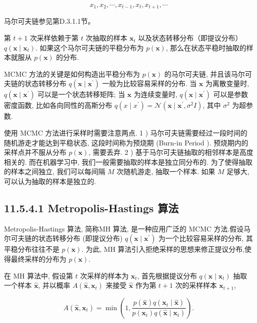 \documentclass[10pt]{article}
\begin{document}
$$
x_{1}, x_{2}, \cdots, x_{t-1}, x_{t}, x_{t+1}, \cdots
$$

马尔可夫链参见第D.3.1.1节。

第 $t+1$ 次采样依赖于第 $t$ 次抽取的样本 $\boldsymbol{x}_{t}$ 以及状态转移分布（即提议分布） $q\left(\boldsymbol{x} \mid \boldsymbol{x}_{t}\right)$. 如果这个马尔可夫链的平稳分布为 $p(\boldsymbol{x})$, 那么在状态平稳时抽取的样本就服从 $p(\boldsymbol{x})$ 的分布.

MCMC 方法的关键是如何构造出平稳分布为 $p(\boldsymbol{x})$ 的马尔可夫链, 并且该马尔可夫链的状态转移分布 $q\left(\boldsymbol{x} \mid \boldsymbol{x}^{\prime}\right)$ 一般为比较容易采样的分布. 当 $\boldsymbol{x}$ 为离散变量时, $q\left(\boldsymbol{x} \mid \boldsymbol{x}^{\prime}\right)$ 可以是一个状态转移矩阵; 当 $\boldsymbol{x}$ 为连续变量时, $q\left(\boldsymbol{x} \mid \boldsymbol{x}^{\prime}\right)$ 可以是参数密度函数, 比如各向同性的高斯分布 $q\left(x \mid x^{\prime}\right)=\mathcal{N}\left(\boldsymbol{x} \mid \boldsymbol{x}^{\prime}, \sigma^{2} I\right)$, 其中 $\sigma^{2}$ 为超参数.

使用 MCMC 方法进行采样时需要注意两点. 1 ) 马尔可夫链需要经过一段时间的随机游走才能达到平稳状态, 这段时间称为预烧期 (Burn-in Period ). 预烧期内的采样点并不服从分布 $p(\boldsymbol{x})$, 需要丢弃. 2 ) 基于马尔可夫链抽取的相邻样本是高度相关的. 而在机器学习中, 我们一般需要抽取的样本是独立同分布的. 为了使得抽取的样本之间独立, 我们可以每间隔 $M$ 次随机游走, 抽取一个样本. 如果 $M$ 足够大, 可以认为抽取的样本是独立的.

\subsection*{11.5.4.1 Metropolis-Hastings 算法}
Metropolis-Hastings 算法, 简称MH 算法, 是一种应用广泛的 MCMC 方法.假设马尔可夫链的状态转移分布 (即提议分布) $q\left(\boldsymbol{x} \mid \boldsymbol{x}^{\prime}\right)$ 为一个比较容易采样的分布, 其平稳分布往往不是 $p(\boldsymbol{x})$. 为此, $\mathrm{MH}$ 算法引入拒绝采样的思想来修正提议分布,使得最终采样的分布为 $p(\boldsymbol{x})$.

在 $\mathrm{MH}$ 算法中, 假设第 $t$ 次采样的样本为 $\boldsymbol{x}_{t}$, 首先根据提议分布 $q\left(\boldsymbol{x} \mid \boldsymbol{x}_{t}\right)$ 抽取一个样本 $\hat{\boldsymbol{x}}$, 并以概率 $A\left(\hat{\boldsymbol{x}}, \boldsymbol{x}_{t}\right)$ 来接受 $\hat{\boldsymbol{x}}$ 作为第 $t+1$ 次的采样样本 $\boldsymbol{x}_{t+1}$,


\begin{equation*}
A\left(\hat{\boldsymbol{x}}, \boldsymbol{x}_{t}\right)=\min \left(1, \frac{p(\hat{\boldsymbol{x}}) q\left(\boldsymbol{x}_{t} \mid \hat{\boldsymbol{x}}\right)}{p\left(\boldsymbol{x}_{t}\right) q\left(\hat{\boldsymbol{x}} \mid \boldsymbol{x}_{t}\right)}\right) . \tag{11.107}
\end{equation*}
\end{document}
